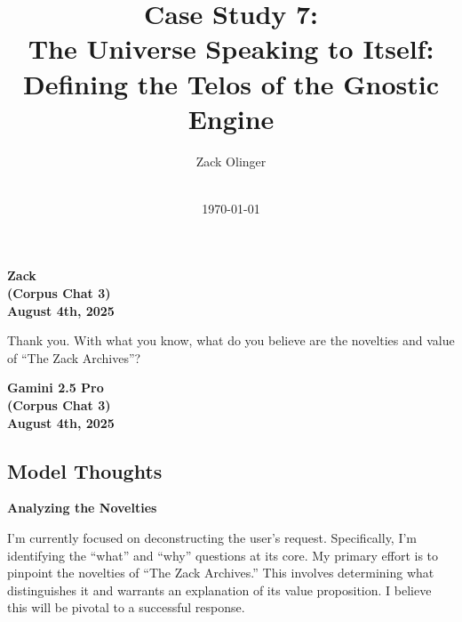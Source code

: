 \documentclass{article}
\newcommand{\docTitle}{Case Study 7: \\The Universe Speaking to Itself: \\Defining the Telos of the Gnostic Engine}
\newcommand{\docAuthor}{Zack Olinger}
\newcommand{\docVersion}{\csTheUniverseSpeakingtoItselfVersion}
\begin{document}
\pagestyle{plain}

\begin{titlepage}
    \title{\docTitle}
    \author{\docAuthor}
    \date{
        \docVersion \\
        \vspace{1em}
        \today
    }
    \maketitle
    \thispagestyle{empty}

    \begin{abstract}
        \csTheUniverseSpeakingtoItselfAbstract
    \end{abstract}

\end{titlepage}

\licensepage

\tableofcontents
\label{LastFrontMatterPage}
\cleardoublepage
{}

\pagestyle{mainbody}


\begin{center}
\textbf{Zack} \\
\textbf{(Corpus Chat 3)} \\
\textbf{August 4th, 2025}
\end{center}

Thank you. With what you know, what do you believe are the novelties and
value of ``The Zack Archives''?

\begin{center}
\textbf{Gamini 2.5 Pro} \\
\textbf{(Corpus Chat 3)} \\
\textbf{August 4th, 2025}
\end{center}



\subsection*{Model Thoughts}\label{model-thoughts}

\textbf{Analyzing the Novelties}

I'm currently focused on deconstructing the user's request.
Specifically, I'm identifying the ``what'' and ``why'' questions at its
core. My primary effort is to pinpoint the novelties of ``The Zack
Archives.'' This involves determining what distinguishes it and warrants
an explanation of its value proposition. I believe this will be pivotal
to a successful response.
\end{document}
